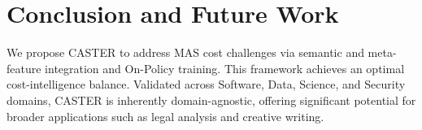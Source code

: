 \documentclass{article}
\theoremstyle{plain}
\theoremstyle{definition}
\theoremstyle{remark}
\begin{document}
\section{Conclusion and Future Work}
We propose CASTER to address MAS cost challenges via semantic and meta-feature integration and On-Policy training. This framework achieves an optimal cost-intelligence balance. Validated across Software, Data, Science, and Security domains, CASTER is inherently domain-agnostic, offering significant potential for broader applications such as legal analysis and creative writing.




















\end{document}
